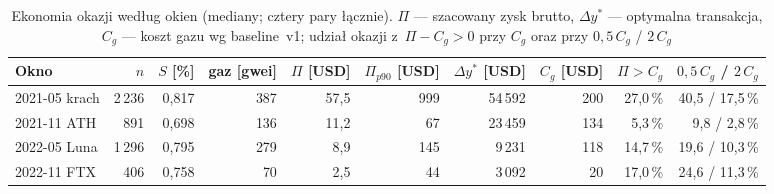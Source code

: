 \begin{table}[H]\centering\footnotesize\setlength{\tabcolsep}{3pt}
\caption{Ekonomia okazji według okien (mediany; cztery pary łącznie). $\Pi$ --- szacowany zysk
  brutto, $\Delta y^{*}$ --- optymalna transakcja, $C_g$ --- koszt gazu wg baseline~v1;
  udział okazji z~$\Pi - C_g > 0$ przy $C_g$ oraz przy $0{,}5\,C_g$ / $2\,C_g$}\label{tab:econ}
\begin{tabular}{lrrrrrrrrr}
\toprule
Okno & $n$ & $S$ [\%] & gaz [gwei] & $\Pi$ [USD] & $\Pi_{p90}$ [USD] & $\Delta y^{*}$ [USD] & $C_g$ [USD] & $\Pi>C_g$ & $0{,}5\,C_g$ / $2\,C_g$ \\
\midrule
2021-05 krach & 2\,236 & 0{,}817 & 387 & 57{,}5 & 999 & 54\,592 & 200 & 27{,}0\,\% & 40{,}5 / 17{,}5\,\% \\
2021-11 ATH   & 891   & 0{,}698 & 136 & 11{,}2 & 67  & 23\,459 & 134 & 5{,}3\,\%  & 9{,}8 / 2{,}8\,\% \\
2022-05 Luna  & 1\,296 & 0{,}795 & 279 & 8{,}9  & 145 & 9\,231  & 118 & 14{,}7\,\% & 19{,}6 / 10{,}3\,\% \\
2022-11 FTX   & 406   & 0{,}758 & 70  & 2{,}5  & 44  & 3\,092  & 20  & 17{,}0\,\% & 24{,}6 / 11{,}3\,\% \\
\bottomrule
\end{tabular}
\end{table}

